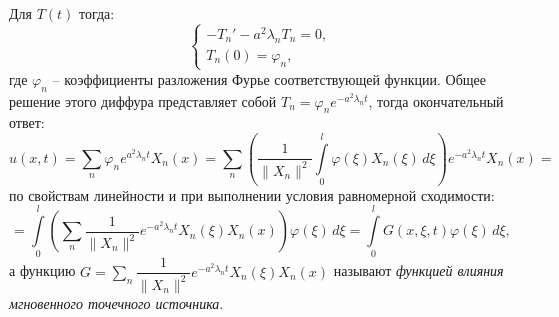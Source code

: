 Для $T(t)$ тогда:
\[
  \begin{cases}
    - T_n' - a^2 \lambda_n T_n = 0, \\ 
    T_n(0) = \varphi_n,
  \end{cases}
\]
где $\varphi_n$ -- коэффициенты разложения Фурье соответствующей функции.
Общее решение этого диффура представляет собой $T_n = \varphi_n e^{- a^2 \lambda_n t}$, тогда
окончательный ответ:
\[
  u(x, t) = \sum_n \varphi_n e^{ a^2 \lambda_n t} X_n(x)
  = \sum_n
    \left( \dfrac{1}{\|X_n\|^2} \int\limits_0^l \varphi(\xi) X_n(\xi) \, d\xi \right)
    e^{- a^2 \lambda_n t} X_n(x) =
\]
по свойствам линейности и при выполнении условия равномерной сходимости:
\[
  = \int\limits_0^l
    \left( \sum_n \dfrac{1}{\|X_n\|^2} e^{- a^2 \lambda_n t} X_n(\xi) X_n(x) \right)
    \varphi(\xi) \, d\xi
  = \int\limits_0^l G(x, \xi, t) \varphi(\xi) \, d\xi,
\]
а функцию $G = \sum_n \dfrac{1}{\|X_n\|^2} e^{- a^2 \lambda_n t} X_n(\xi) X_n(x)$ называют
\emph{функцией влияния мгновенного точечного источника}.

